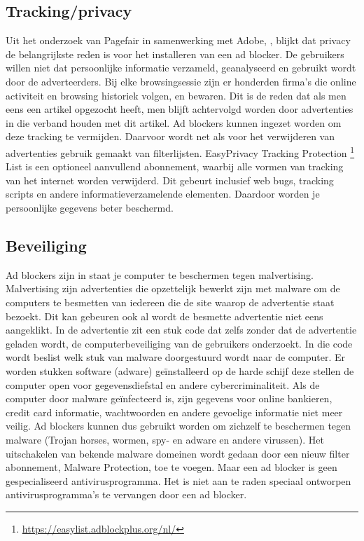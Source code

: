 \documentclass[pdftex,a4paper,12pt,twoside]{report}
\begin{document}
\subsection{Tracking/privacy}
\label{sec tracking/privacy}
Uit het onderzoek van Pagefair in samenwerking met Adobe, \cite{PageFair2015}, blijkt dat privacy de belangrijkste reden is voor het installeren van een ad blocker. De gebruikers willen niet dat persoonlijke informatie verzameld, geanalyseerd en gebruikt wordt door de adverteerders. Bij elke browsingsessie zijn er honderden firma's die online activiteit en browsing historiek volgen, en bewaren. Dit is de reden dat als men eens een artikel opgezocht heeft, men blijft achtervolgd worden door advertenties in die verband houden met dit artikel. Ad blockers kunnen ingezet worden om deze tracking te vermijden. Daarvoor wordt net als voor het verwijderen van advertenties gebruik gemaakt van filterlijsten. EasyPrivacy Tracking Protection \footnote{\url{https://easylist.adblockplus.org/nl/}} List is een optioneel aanvullend abonnement, waarbij alle vormen van tracking van het internet worden verwijderd. Dit gebeurt inclusief web bugs, tracking scripts en andere informatieverzamelende elementen. Daardoor worden je persoonlijke gegevens beter beschermd.

\subsection{Beveiliging}
\label{sec Beveiliging}
Ad blockers zijn in staat je computer te beschermen tegen malvertising. Malvertising zijn advertenties die opzettelijk bewerkt zijn met malware om de computers te besmetten van iedereen die de site waarop de advertentie staat bezoekt. Dit kan gebeuren ook al wordt de besmette advertentie niet eens aangeklikt. 
In de advertentie zit een stuk code dat zelfs zonder dat de advertentie geladen wordt, de computerbeveiliging van de gebruikers onderzoekt. In die code wordt beslist welk stuk van malware doorgestuurd wordt naar de computer. Er worden stukken software (adware) geïnstalleerd op de harde schijf deze stellen de computer open voor gegevensdiefstal en andere cybercriminaliteit. Als de computer door malware geïnfecteerd is, zijn gegevens voor online bankieren, credit card informatie, wachtwoorden en andere gevoelige informatie niet meer veilig. 
Ad blockers kunnen dus gebruikt worden om zichzelf te beschermen tegen malware (Trojan horses, wormen, spy- en adware en andere virussen). Het uitschakelen van bekende malware domeinen wordt gedaan door een nieuw filter abonnement, Malware Protection, toe te voegen. Maar een ad blocker is geen gespecialiseerd antivirusprogramma. Het is niet aan te raden speciaal ontworpen antivirusprogramma's te vervangen door een ad blocker. 
\end{document}
